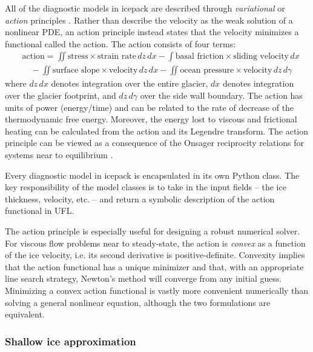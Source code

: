 \documentclass[journal abbreviation, manuscript]{copernicus}
\begin{document}
All of the diagnostic models in icepack are described through \emph{variational} or \emph{action} principles \citep{dukowicz2010consistent}.
Rather than describe the velocity as the weak solution of a nonlinear PDE, an action principle instead states that the velocity minimizes a functional called the action.
The action consists of four terms:
\begin{align}
    & \text{action} = \iint\text{stress} \times \text{strain rate}\,dz\,dx - \int\text{basal friction} \times \text{sliding velocity}\,dx \nonumber \\
    & \quad - \iint\text{surface slope}\times\text{velocity}\,dz\,dx - \iint\text{ocean pressure}\times\text{velocity}\,dz\,d\gamma
    \label{action-functional}
\end{align}
where $dz\,dx$ denotes integration over the entire glacier, $dx$ denotes integration over the glacier footprint, and $dz\,d\gamma$ over the side wall boundary.
The action has units of power (energy/time) and can be related to the rate of decrease of the thermodynamic free energy.
Moreover, the energy lost to viscous and frictional heating can be calculated from the action and its Legendre transform.
The action principle can be viewed as a consequence of the Onsager reciprocity relations for systems near to equilibrium \citep{de2013non}.

Every diagnostic model in icepack is encapsulated in its own Python class.
The key responsibility of the model classes is to take in the input fields -- the ice thickness, velocity, etc. -- and return a symbolic description of the action functional in UFL.

The action principle is especially useful for designing a robust numerical solver.
For viscous flow problems near to steady-state, the action is \emph{convex} as a function of the ice velocity, i.e. its second derivative is positive-definite.
Convexity implies that the action functional has a unique minimizer and that, with an appropriate line search strategy, Newton's method will converge from any initial guess.
Minimizing a convex action functional is vastly more convenient numerically than solving a general nonlinear equation, although the two formulations are equivalent.

\subsubsection{Shallow ice approximation}
\end{document}
